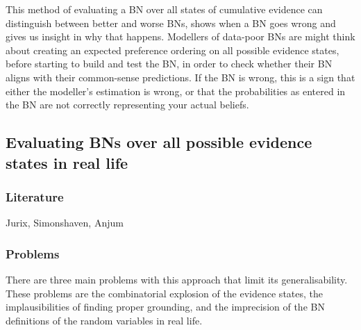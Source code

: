 \documentclass[11pt]{article}
\begin{document}
This method of evaluating a BN over all states of cumulative evidence can distinguish between better and worse BNs, shows when a BN goes wrong and gives us insight in why that happens. Modellers of data-poor BNs are might think about creating an expected preference ordering on all possible evidence states, before starting to build and test the BN, in order to check whether their BN aligns with their common-sense predictions. If the BN is wrong, this is a sign that either the modeller's estimation is wrong, or that the probabilities as entered in the BN are not correctly representing your actual beliefs.


\subsection{Evaluating BNs over all possible evidence states in real life }

\subsubsection{Literature}
Jurix, Simonshaven, Anjum


\subsubsection{Problems}

There are three main problems with this approach that limit its generalisability. These problems are the combinatorial explosion of the evidence states, the implausibilities of finding proper grounding, and the imprecision of the BN definitions of the random variables in real life.
\end{document}
